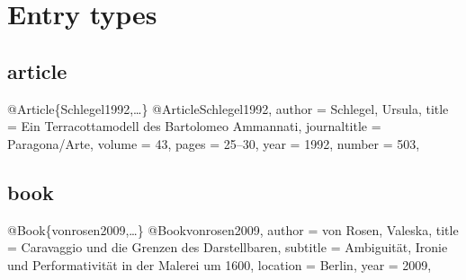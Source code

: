 \documentclass[a4paper,
10pt,
ngerman,
english
]{ltxdoc}
\begin{document}
%
%
%
%
%
%
%
%
%
%

\section{Entry types}
\subsection{article}
\begin{bibexample}[label=Schlegel1992]{{@}Article\{Schlegel1992,…\}}
@Article{Schlegel1992,
  author       = {Schlegel, Ursula},
  title        = {Ein Terracottamodell des Bartolomeo Ammannati},
  journaltitle = {Paragona/Arte},
  volume       = {43},
  pages        = {25--30},
  year         = {1992},
  number       = {503},
}
\end{bibexample}


\subsection{book}
\begin{bibexample}[label=vonrosen2009]{{@}Book\{vonrosen2009,…\}}
@Book{vonrosen2009,
  author   = {von Rosen, Valeska},
  title    = {Caravaggio und die Grenzen des Darstellbaren},
  subtitle = {Ambiguität, Ironie und Performativität in der Malerei um 1600},
  location = {Berlin},
  year     = {2009},
}
\end{bibexample}
\end{document}
